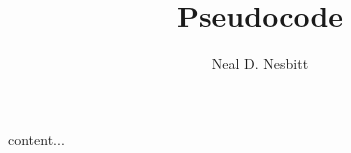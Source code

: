 \documentclass{article}
\title{Pseudocode}
\author{Neal D. Nesbitt}
\begin{document}
\maketitle

content...
\end{document}
